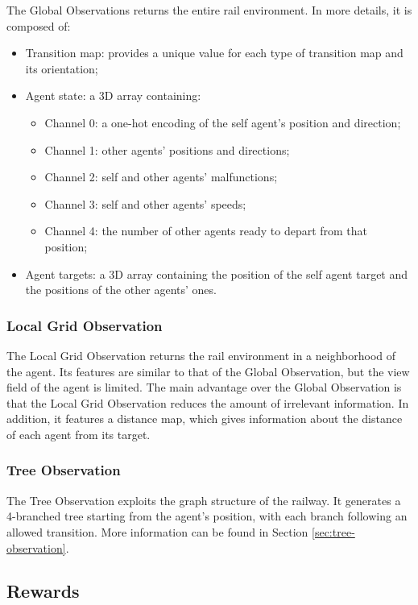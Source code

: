 \documentclass[a4paper, 12pt]{article}
\numberwithin{equation}{section}
\begin{document}
The Global Observations returns the entire rail environment. In more details, it is composed of:
\begin{itemize}
	\item Transition map: provides a unique value for each type of transition map and its orientation;
	\item Agent state: a 3D array containing:
	\begin{itemize}
		\item Channel 0: a one-hot encoding of the self agent's position and direction;
		\item Channel 1: other agents' positions and directions;
		\item Channel 2: self and other agents' malfunctions;
		\item Channel 3: self and other agents' speeds;
		\item Channel 4: the number of other agents ready to depart from that position;
	\end{itemize}
	\item Agent targets: a 3D array containing the position of the self agent target and the positions of the other agents' ones.
\end{itemize}

\subsubsection{Local Grid Observation}

The Local Grid Observation returns the rail environment in a neighborhood of the agent. Its features are similar to that of the Global Observation, but the view field of the agent is limited. The main advantage over the Global Observation is that the Local Grid Observation reduces the amount of irrelevant information. In addition, it features a distance map, which gives information about the distance of each agent from its target.


\subsubsection{Tree Observation}

The Tree Observation exploits the graph structure of the railway. It generates a 4-branched tree starting from the agent's position, with each branch following an allowed transition. More information can be found in Section \ref{sec:tree-observation}.


\subsection[Rewards]{Rewards \cite{actions-rewards}}
\end{document}
